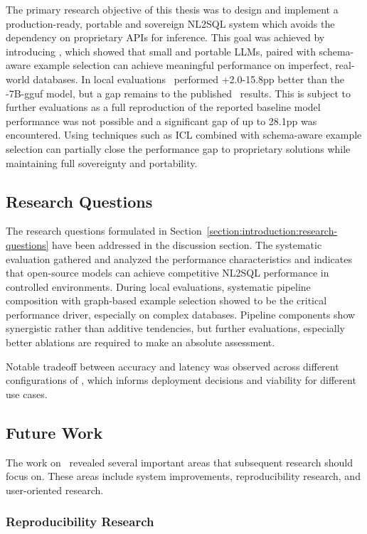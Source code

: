 The primary research objective of this thesis was to design and implement a
production-ready, portable and sovereign NL2SQL system which avoids the
dependency on proprietary APIs for inference. This goal was achieved by
introducing \Natural, which showed that small and portable LLMs, paired with
schema-aware example selection can achieve meaningful performance on imperfect,
real-world databases. In local evaluations \Natural~performed +2.0-15.8pp
better than the \OmniSQL-7B-gguf model, but a gap remains to the published
\OmniSQL~results. This is subject to further evaluations as a full
reproduction of the reported baseline model performance was not possible and a
significant gap of up to 28.1pp was encountered. Using techniques such as
ICL combined with schema-aware example selection can partially close the
performance gap to proprietary solutions while maintaining full sovereignty and
portability.

\subsection{Research Questions}

The research questions formulated in Section~\ref{section:introduction:research-questions}
have been addressed in the discussion section. The systematic
evaluation gathered and analyzed the performance characteristics and indicates
that open-source models can achieve competitive NL2SQL performance in
controlled environments. During local evaluations, systematic pipeline
composition with graph-based example selection showed to be the critical
performance driver, especially on complex databases. Pipeline components show
synergistic rather than additive tendencies, but further evaluations,
especially better ablations are required to make an absolute assessment.

Notable tradeoff between accuracy and latency was observed across different
configurations of \Natural, which informs deployment decisions and viability
for different use cases.

\subsection{Future Work}

The work on \Natural~revealed several important areas that subsequent research
should focus on. These areas include system improvements, reproducibility
research, and user-oriented research.

\subsubsection{Reproducibility Research}

